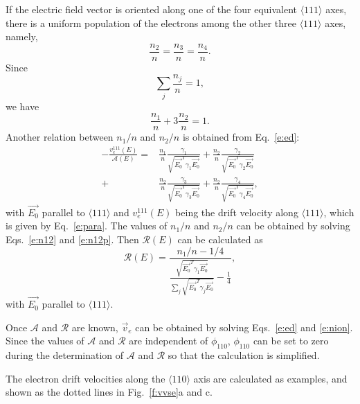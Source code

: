 \documentclass[epj,referee]{svjour}
\begin{document}
If the electric field vector is oriented along one of the four
equivalent $\langle 111 \rangle$ axes, there is a uniform population
of the electrons among the other three $\langle 111 \rangle$ axes,
namely,
\begin{equation} 
\label{e:n111} 
\frac{n_{2}}{n} = \frac{n_{3}}{n} = \frac{n_{4}}{n}. 
\end{equation} 
Since 
\begin{equation} 
\label{e:nsum} 
\displaystyle \sum_{j}\frac{n_{j}}{n} = 1, 
\end{equation} 
we have 
\begin{equation} 
\label{e:n12} 
\frac{n_{1}}{n} + 3\frac{n_{2}}{n}= 1. 
\end{equation} 
Another relation between $n_{1}/n$ and $n_{2}/n$ is obtained from
Eq.~\ref{e:ed}:
\begin{equation} 
\label{e:n12p} 
\begin{split}
- \frac{v_{e}^{111}(E)}{\mathcal{A}(E)} = &
\frac{n_{1}}{n} \frac{\gamma_{1}} 
{\sqrt{\vec{E_{0}}^{T}\gamma_{1}\vec{E_{0}}}} +
\frac{n_{2}}{n} \frac{\gamma_{2}}         
{\sqrt{\vec{E_{0}}^{T}\gamma_{2}\vec{E_{0}}}} \\ + &
\frac{n_{2}}{n} \frac{\gamma_{3}}         
{\sqrt{\vec{E_{0}}^{T}\gamma_{3}\vec{E_{0}}}} +  
\frac{n_{2}}{n} \frac{\gamma_{4}}         
{\sqrt{\vec{E_{0}}^{T}\gamma_{4}\vec{E_{0}}}}, 
\end{split}
\end{equation}
with $\vec{E_{0}}$ parallel to $\langle 111 \rangle$ and
$v_{e}^{111}(E)$ being the drift velocity along $\langle 111 \rangle$,
which is given by Eq.~\ref{e:para}. The values of $n_{1}/n$ and
$n_{2}/n$ can be obtained by solving Eqs.~\ref{e:n12} and
\ref{e:n12p}. Then $\mathcal{R}(E)$ can be calculated as
\begin{equation} 
\label{e:re} 
\mathcal{R}(E) = \frac{n_{1}/n - 1/4}
{\displaystyle \frac{\sqrt{\vec{E_{0}}^{T}\gamma_{1}\vec{E_{0}}}}
{\sum_{j}\sqrt{\vec{E_{0}}^{T}\gamma_{j}\vec{E_{0}}}} - 
\frac{1}{4}},
\end{equation} 
with $\vec{E_{0}}$ parallel to $\langle 111 \rangle$.

Once $\mathcal{A}$ and $\mathcal{R}$ are known, $\vec{v}_{e}$ can be
obtained by solving Eqs.~\ref{e:ed} and \ref{e:nion}. Since the values
of $\mathcal{A}$ and $\mathcal{R}$ are independent of $\phi_{110}$,
$\phi_{110}$ can be set to zero during the determination of
$\mathcal{A}$ and $\mathcal{R}$ so that the calculation is simplified.

The electron drift velocities along the $\langle 110 \rangle$ axis are
calculated as examples, and shown as the dotted lines in
Fig.~\ref{f:vvse}a and c.
\end{document}
